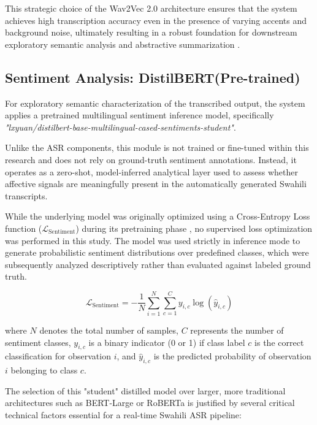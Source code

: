 This strategic choice of the Wav2Vec 2.0 architecture ensures that the system achieves high transcription accuracy even in the presence of varying accents and background noise, ultimately resulting in a robust foundation for downstream exploratory semantic analysis and abstractive summarization \citep{DHAHBI2025100615}.

\subsection{Sentiment Analysis: DistilBERT(Pre-trained)}
For exploratory semantic characterization of the transcribed output, the system applies a pretrained multilingual sentiment inference model, specifically \textit{"lxyuan/distilbert-base-multilingual-cased-sentiments-student"}. 

Unlike the ASR components, this module is not trained or fine-tuned within this research and does not rely on ground-truth sentiment annotations. Instead, it operates as a zero-shot, model-inferred analytical layer used to assess whether affective signals are meaningfully present in the automatically generated Swahili transcripts.

While the underlying model was originally optimized using a Cross-Entropy Loss function ($\mathcal{L}_{\text{Sentiment}}$) during its pretraining phase \citep{Kumar_Deep_Kalra_2024}, no supervised loss optimization was performed in this study. The model was used strictly in inference mode to generate probabilistic sentiment distributions over predefined classes, which were subsequently analyzed descriptively rather than evaluated against labeled ground truth.

\begin{equation}
    \mathcal{L}_{\text{Sentiment}} = - \frac{1}{N} \sum_{i=1}^{N} \sum_{c=1}^{C} y_{i,c} \log(\hat{y}_{i,c})
\end{equation}

where $N$ denotes the total number of samples, $C$ represents the number of sentiment classes, $y_{i,c}$ is a binary indicator (0 or 1) if class label $c$ is the correct classification for observation $i$, and $\hat{y}_{i,c}$ is the predicted probability of observation $i$ belonging to class $c$.

The selection of this "student" distilled model over larger, more traditional architectures such as BERT-Large or RoBERTa is justified by several critical technical factors essential for a real-time Swahili ASR pipeline:

